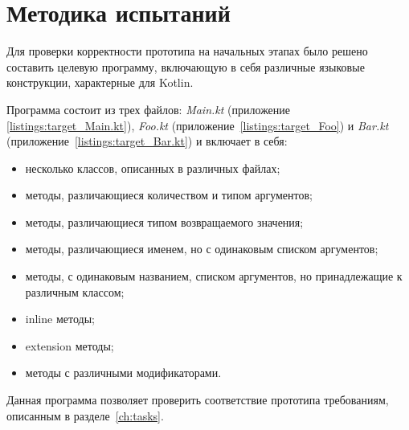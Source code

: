 \section{Методика испытаний}
\label{sec:testing_methodology}
Для проверки корректности прототипа на начальных этапах было решено составить целевую программу, включающую в себя различные языковые конструкции, характерные для Kotlin.

Программа состоит из трех файлов: \textit{Main.kt} (приложение \ref{listings:target_Main.kt}), \textit{Foo.kt} (приложение~\ref{listings:target_Foo}) и \textit{Bar.kt} (приложение~\ref{listings:target_Bar.kt}) и включает в себя:
\begin{itemize}
    \item несколько классов, описанных в различных файлах;
    \item методы, различающиеся количеством и типом аргументов;
    \item методы, различающиеся типом возвращаемого значения;
    \item методы, различающиеся именем, но с одинаковым списком аргументов;
    \item методы, с одинаковым названием, списком аргументов, но принадлежащие к различным классом;
    \item inline методы;
    \item extension методы;
    \item методы с различными модификаторами.
\end{itemize}
Данная программа позволяет проверить соответствие прототипа требованиям, описанным в разделе~\ref{ch:tasks}.

